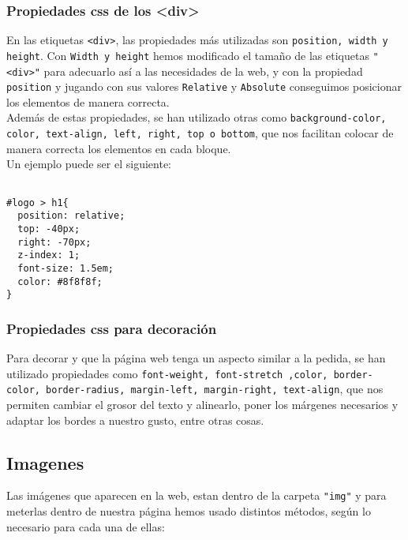 \documentclass[10pt,a4paper]{article}
\begin{document}
\subsubsection{Propiedades css de los <div>}

En las etiquetas \texttt{<div>}, las propiedades más utilizadas son \texttt{position, width y height}. Con \texttt{Width y height} hemos modificado el tamaño de las etiquetas \texttt{"<div>"} para adecuarlo así a las necesidades de la web, y con la propiedad \texttt{position} y jugando con sus valores \texttt{Relative} y \texttt{Absolute} conseguimos posicionar los elementos de manera correcta.\\

Además de estas propiedades, se han utilizado otras como \texttt{background-color, color, text-align, left, right, top o bottom}, que nos facilitan colocar de manera correcta los elementos en cada bloque.\\

Un ejemplo puede ser el siguiente:

\begin{verbatim}

#logo > h1{
  position: relative;
  top: -40px;
  right: -70px;
  z-index: 1;
  font-size: 1.5em;
  color: #8f8f8f;
}

\end{verbatim}



\subsubsection{Propiedades css para decoración}



Para decorar y que la página web tenga un aspecto similar a la pedida, se han utilizado propiedades como \texttt{font-weight, font-stretch ,color, border-color, border-radius, margin-left, margin-right, text-align},
que nos permiten cambiar el grosor del texto y alinearlo, poner los márgenes necesarios y adaptar los bordes a nuestro gusto, entre otras cosas.


\subsection{Imagenes}



Las imágenes que aparecen en la web, estan dentro de la carpeta \texttt{"img"} y para meterlas dentro de nuestra página hemos usado distintos métodos, según lo necesario para cada una de ellas:\\
\end{document}
